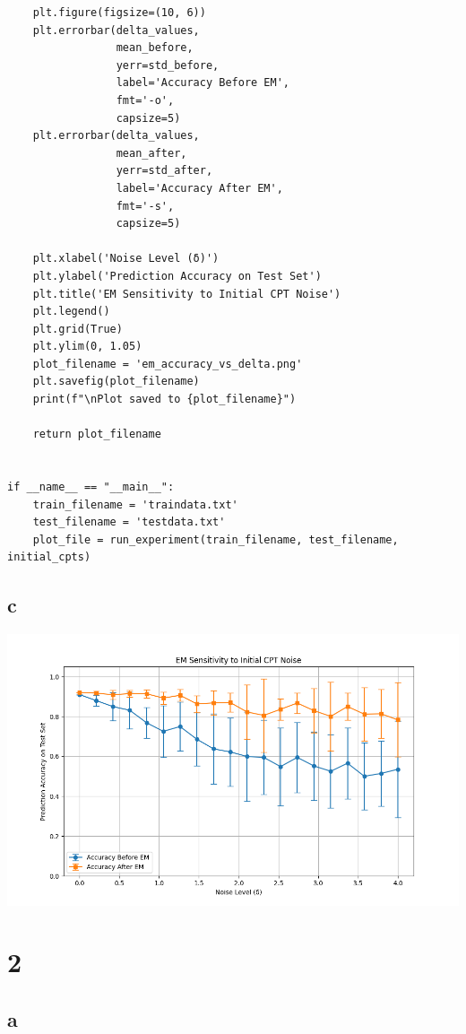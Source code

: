 \documentclass[11pt]{article}
\begin{document}
\begin{verbatim}
    plt.figure(figsize=(10, 6))
    plt.errorbar(delta_values,
                 mean_before,
                 yerr=std_before,
                 label='Accuracy Before EM',
                 fmt='-o',
                 capsize=5)
    plt.errorbar(delta_values,
                 mean_after,
                 yerr=std_after,
                 label='Accuracy After EM',
                 fmt='-s',
                 capsize=5)

    plt.xlabel('Noise Level (δ)')
    plt.ylabel('Prediction Accuracy on Test Set')
    plt.title('EM Sensitivity to Initial CPT Noise')
    plt.legend()
    plt.grid(True)
    plt.ylim(0, 1.05)
    plot_filename = 'em_accuracy_vs_delta.png'
    plt.savefig(plot_filename)
    print(f"\nPlot saved to {plot_filename}")

    return plot_filename


if __name__ == "__main__":
    train_filename = 'traindata.txt'
    test_filename = 'testdata.txt'
    plot_file = run_experiment(train_filename, test_filename, initial_cpts)
\end{verbatim}

\subsection{c}

\includegraphics[width=1.0\textwidth]{em_accuracy_vs_delta.png}

\section{2}

\subsection{a}
\end{document}
